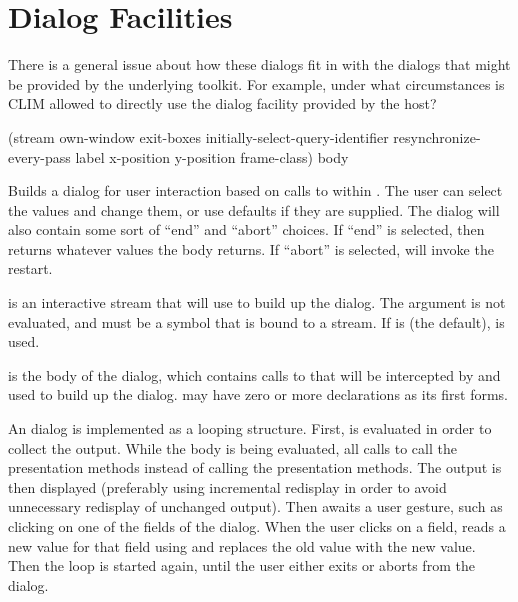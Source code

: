 
\chapter {Dialog Facilities}
\label {dialogs}

 {There is a general issue about how these dialogs fit in with the
dialogs that might be provided by the underlying toolkit.  For example, under
what circumstances is CLIM allowed to directly use the dialog facility provided
by the host?}


 {(\optional stream
                               \key own-window exit-boxes initially-select-query-identifier
                                    resynchronize-every-pass
                                    label x-position y-position frame-class)
                              \body body}

Builds a dialog for user interaction based on calls to  within
. The user can select the values and change them, or use defaults if
they are supplied.  The dialog will also contain some sort of ``end'' and
``abort'' choices.  If ``end'' is selected, then  returns
whatever values the body returns.  If ``abort'' is selected,
 will invoke the  restart.

 is an interactive stream that  will use to
build up the dialog.  The  argument is not evaluated, and must be a
symbol that is bound to a stream.  If  is  (the default),
 is used.

 is the body of the dialog, which contains calls to  that
will be intercepted by  and used to build up the dialog.
 may have zero or more declarations as its first forms.

An  dialog is implemented as a looping structure.  First,
 is evaluated in order to collect the output.  While the body is being
evaluated, all calls to  call the 
presentation methods instead of calling the  presentation methods.
The output is then displayed (preferably using incremental redisplay in order to
avoid unnecessary redisplay of unchanged output).  Then 
awaits a user gesture, such as clicking on one of the fields of the dialog.
When the user clicks on a field,  reads a new value for
that field using  and replaces the old value with the new value.
Then the loop is started again, until the user either exits or aborts from the
dialog.

